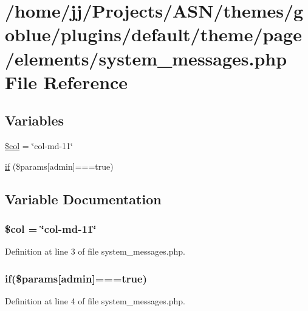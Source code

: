 \hypertarget{system__messages_8php}{}\section{/home/jj/\+Projects/\+A\+S\+N/themes/goblue/plugins/default/theme/page/elements/system\+\_\+messages.php File Reference}
\label{system__messages_8php}
\subsection*{Variables}
\begin{DoxyCompactItemize}
\item 
\hyperlink{system__messages_8php_afca5b7d4c9144178253e99d0ada7d519}{\$col} = \char`\"{}col-\/md-\/11\char`\"{}
\item 
\hyperlink{system__messages_8php_aaeb0bb30b6b6a6bc455c9c4dcf5f01a4}{if} (\$params\mbox{[}\textquotesingle{}admin\textquotesingle{}\mbox{]}===true)
\end{DoxyCompactItemize}


\subsection{Variable Documentation}
\subsubsection[{\texorpdfstring{\$col}{$col}}]{\setlength{\rightskip}{0pt plus 5cm}\$col = \char`\"{}col-\/md-\/11\char`\"{}}\hypertarget{system__messages_8php_afca5b7d4c9144178253e99d0ada7d519}{}\label{system__messages_8php_afca5b7d4c9144178253e99d0ada7d519}


Definition at line 3 of file system\+\_\+messages.\+php.

\subsubsection[{\texorpdfstring{if}{if}}]{\setlength{\rightskip}{0pt plus 5cm}if(\$params\mbox{[}\textquotesingle{}admin\textquotesingle{}\mbox{]}===true)}\hypertarget{system__messages_8php_aaeb0bb30b6b6a6bc455c9c4dcf5f01a4}{}\label{system__messages_8php_aaeb0bb30b6b6a6bc455c9c4dcf5f01a4}


Definition at line 4 of file system\+\_\+messages.\+php.

